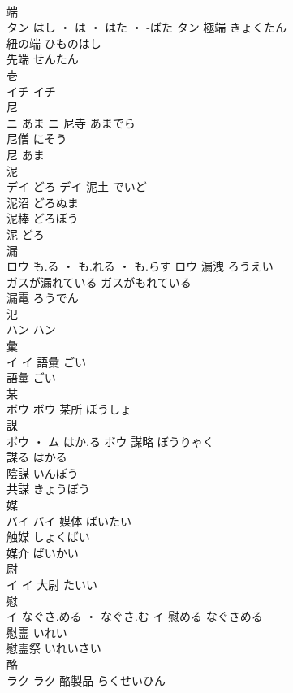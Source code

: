\documentclass[8pt]{extreport}
\begin{document}
\begin{CJK}{UTF8}{min}
\\	端	
\\	タン	はし ・ は ・ はた ・ -ばた	タン	極端	きょくたん	
\\	紐の端	ひものはし	
\\	先端	せんたん	
\\	壱	
\\	イチ		イチ																																			
\\	尼	
\\	ニ	あま	ニ	尼寺	あまでら	
\\	尼僧	にそう	
\\	尼	あま	
\\	泥	
\\	デイ	どろ	デイ	泥土	でいど	
\\	泥沼	どろぬま	
\\	泥棒	どろぼう	
\\	泥	どろ	
\\	漏	
\\	ロウ	も.る ・ も.れる ・ も.らす	ロウ	漏洩	ろうえい	
\\	ガスが漏れている	ガスがもれている	
\\	漏電	ろうでん	
\\	氾	
\\	ハン		ハン																																			
\\	彙	
\\	イ		イ	語彙	ごい	
\\	語彙	ごい	
\\	某	
\\	ボウ		ボウ													某所	ぼうしょ	
\\	謀	
\\	ボウ ・ ム	はか.る	ボウ	謀略	ぼうりゃく	
\\	謀る	はかる	
\\	陰謀	いんぼう	
\\	共謀	きょうぼう	
\\	媒	
\\	バイ		バイ	媒体	ばいたい	
\\	触媒	しょくばい	
\\	媒介	ばいかい	
\\	尉	
\\	イ		イ													大尉	たいい	
\\	慰	
\\	イ	なぐさ.める ・ なぐさ.む	イ	慰める	なぐさめる	
\\	慰霊	いれい	
\\	慰霊祭	いれいさい	
\\	酪	
\\	ラク		ラク	酪製品	らくせいひん	

\end{CJK}
\end{document}
